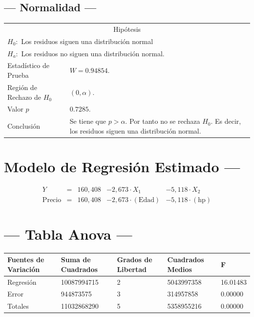 \documentclass{article}
\begin{document}
\subsection{--- Normalidad ---} %
\begin{center}
  \begin{tabular}{|l|p{8cm}|}
    \cline{1-2}
    \multicolumn{2}{|c|}{Hipótesis}\\ \cline{1-2}
    \multicolumn{2}{|l|}{\(H_0:\) Los residuos siguen una distribución normal} \\ 
    \multicolumn{2}{|l|}{\(H_a:\) Los residuos no siguen una distribución normal.} \\ \cline{1-2}
    Estadístico de Prueba & \(W = 0.94854\).\\ \cline{1-2} 
		Región de Rechazo de \(H_0\) & \((0, \alpha )\).\\ \cline{1-2} 
    Valor \(p\) & \(0.7285\).\\ \cline{1-2} 
    Conclusión & Se tiene que \(p> \alpha\). \newline 
		Por tanto no se rechaza \(H_0\). \newline 
		Es decir, los residuos siguen una distribución normal.\\ \cline{1-2} 
  \end{tabular}
\end{center}


\newpage

\section{\centering Modelo de Regresión Estimado ---} %
\begin{align}
	Y & = &              160,408 & - 2,673 \cdot X_1           & - 5,118     \cdot X_2   \\[2mm]
	\mbox{Precio} & = &  160,408 & - 2,673 \cdot (\mbox{Edad}) & - 5,118     \cdot (\mbox{hp})
	\label{eq:1}
\end{align}

\section{\centering --- Tabla Anova ---} %
\begin{center}
  \begin{tabular}{|l|l|l|l|l|}
    \hline 
    Fuentes de Variación  & Suma de Cuadrados & Grados de Libertad & Cuadrados Medios & F\\ \hline 
Regresión  &  10087994715          &  2       & 5043997358 & 16.01483\\ \hline
Error      &    944873575          &  3       &  314957858 &  0.00000\\ \hline
Totales    &  11032868290          &  5       & 5358955216 &  0.00000\\ \hline
  \end{tabular}
\end{center} 
\end{document}

